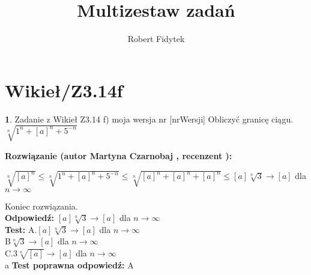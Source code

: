 \documentclass[12pt, a4paper]{article}
\title{Multizestaw zadań}
\author{Robert Fidytek}
\date{}
\theoremstyle{definition} %
\newtheorem{zad}{}
\newcommand{\kategoria}[1]{\section{#1}} %
\newcommand{\zadStart}[1]{\begin{zad}#1\newline} %
\newcommand{\zadStop}{\end{zad}}   %
\newcommand{\rozwStart}[2]{\noindent \textbf{Rozwiązanie (autor #1 , recenzent #2): }\newline} %
\newcommand{\rozwStop}{\newline}                                            %
\newcommand{\odpStart}{\noindent \textbf{Odpowiedź:}\newline}    %
\newcommand{\odpStop}{\newline}                                             %
\newcommand{\testStart}{\noindent \textbf{Test:}\newline} %
\newcommand{\testStop}{\newline} %
\newcommand{\kluczStart}{\noindent \textbf{Test poprawna odpowiedź:}\newline} %
\newcommand{\kluczStop}{\newline} %
\begin{document}
\maketitle


\kategoria{Wikieł/Z3.14f}
\zadStart{Zadanie z Wikieł Z3.14 f) moja wersja nr [nrWersji]}
Obliczyć granicę ciągu.\\
$ \sqrt[n]{1^{n} + [a]^{n} + 5^{-n}} $\\
\zadStop
\rozwStart{Martyna Czarnobaj}{}
\begin{center}
	$ \sqrt[n]{[a]^{n}} \leq \sqrt[n]{1^{n} + [a]^{n} + 5^{-n}} \leq \sqrt[n]{[a]^{n} + [a]^{n} + [a]^{n}} \leq [a] \sqrt[n]{3} \rightarrow [a]  $ dla $ n \rightarrow \infty $\\
\end{center}

Koniec rozwiązania.\\
\rozwStop
\odpStart
$ [a] \sqrt[n]{3} \rightarrow [a]  $ dla $ n \rightarrow \infty $\\
\odpStop
\testStart
A.$[a] \sqrt[n]{3} \rightarrow [a]  $ dla $ n \rightarrow \infty $\\

B$  \sqrt[n]{3} \rightarrow [a]  $ dla $ n \rightarrow \infty $\\

C.$ 3 \sqrt[n]{[a]} \rightarrow [a]  $ dla $ n \rightarrow \infty $\\
a
\testStop
\kluczStart
A
\kluczStop
\end{document}

